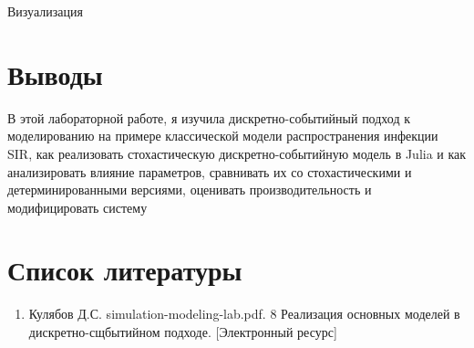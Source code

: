 \documentclass[
  12pt,
  a4paper,
  DIV=11,
  numbers=noendperiod]{scrreprt}
\newenvironment{Shaded}{\begin{snugshade}}{\end{snugshade}}
\newcommand{\FunctionTok}[1]{\textcolor[rgb]{0.28,0.35,0.67}{#1}}
\newcommand{\NormalTok}[1]{\textcolor[rgb]{0.00,0.23,0.31}{#1}}
\newcommand{\OperatorTok}[1]{\textcolor[rgb]{0.37,0.37,0.37}{#1}}
\newcommand{\PreprocessorTok}[1]{\textcolor[rgb]{0.68,0.00,0.00}{#1}}
\newcommand{\SpecialCharTok}[1]{\textcolor[rgb]{0.37,0.37,0.37}{#1}}
\newcommand{\StringTok}[1]{\textcolor[rgb]{0.13,0.47,0.30}{#1}}
\providecommand{\tightlist}{%
  \setlength{\itemsep}{0pt}\setlength{\parskip}{0pt}}\usepackage{longtable,booktabs,array}
\begin{document}
Визуализация

\begin{Shaded}
\end{Shaded}



\chapter{Выводы}\label{ux432ux44bux432ux43eux434ux44b}

В этой лабораторной работе, я изучила дискретно-событийный подход к
моделированию на примере классической модели распространения инфекции
SIR, как реализовать стохастическую дискретно-событийную модель в Julia
и как анализировать влияние параметров, сравнивать их со стохастическими
и детерминированными версиями, оценивать производительность и
модифицировать систему

\chapter*{Список
литературы}\label{ux441ux43fux438ux441ux43eux43a-ux43bux438ux442ux435ux440ux430ux442ux443ux440ux44b}

\begin{enumerate}
\def\labelenumi{\arabic{enumi}.}
\tightlist
\item
  Кулябов Д.С. simulation-modeling-lab.pdf. 8 Реализация основных
  моделей в дискретно-сщбытийном подходе. {[}Электронный ресурс{]}
\end{enumerate}


\printbibliography
\end{document}
